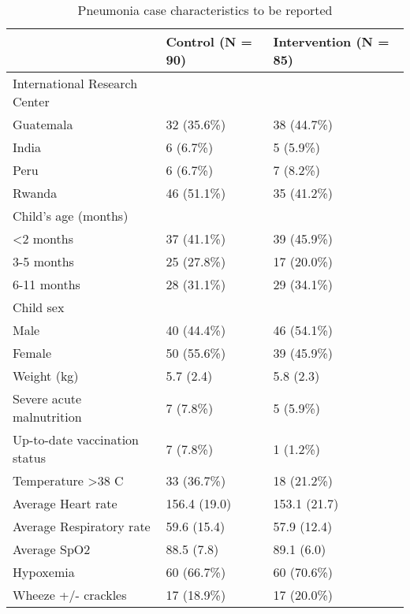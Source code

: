 \documentclass[
]{article}
\begin{document}
\begin{table}[H]

\caption{\label{tab:unnamed-chunk-6}Pneumonia case characteristics to be reported}
\centering
\begin{tabular}[t]{l|l|l}
\hline
  & Control (N = 90) & Intervention (N = 85)\\
\hline
International Research Center &  & \\
\hline
\hspace{1em}Guatemala & 32 (35.6\%) & 38 (44.7\%)\\
\hline
\hspace{1em}India & 6  (6.7\%) & 5  (5.9\%)\\
\hline
\hspace{1em}Peru & 6  (6.7\%) & 7  (8.2\%)\\
\hline
\hspace{1em}Rwanda & 46 (51.1\%) & 35 (41.2\%)\\
\hline
Child’s age (months) &  & \\
\hline
\hspace{1em}<2 months & 37 (41.1\%) & 39 (45.9\%)\\
\hline
\hspace{1em}3-5 months & 25 (27.8\%) & 17 (20.0\%)\\
\hline
\hspace{1em}6-11 months & 28 (31.1\%) & 29 (34.1\%)\\
\hline
Child sex &  & \\
\hline
\hspace{1em}Male & 40 (44.4\%) & 46 (54.1\%)\\
\hline
\hspace{1em}Female & 50 (55.6\%) & 39 (45.9\%)\\
\hline
Weight (kg) & 5.7 (2.4) & 5.8 (2.3)\\
\hline
Severe acute malnutrition & 7  (7.8\%) & 5  (5.9\%)\\
\hline
Up-to-date vaccination status & 7  (7.8\%) & 1  (1.2\%)\\
\hline
Temperature >38 C & 33 (36.7\%) & 18 (21.2\%)\\
\hline
Average Heart rate & 156.4 (19.0) & 153.1 (21.7)\\
\hline
Average Respiratory rate & 59.6 (15.4) & 57.9 (12.4)\\
\hline
Average SpO2 & 88.5 (7.8) & 89.1 (6.0)\\
\hline
Hypoxemia & 60 (66.7\%) & 60 (70.6\%)\\
\hline
Wheeze +/- crackles & 17 (18.9\%) & 17 (20.0\%)\\

\end{tabular}
\end{table}
\end{document}
